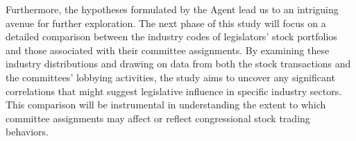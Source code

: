 \documentclass[15pt,letterpaper]{article}
\begin{document}
  Furthermore, the hypotheses formulated by the Agent lead us to an intriguing avenue for further exploration. The next phase of this study will focus on a detailed comparison between the industry codes of legislators' stock portfolios and those associated with their committee assignments. By examining these industry distributions and drawing on data from both the stock transactions and the committees' lobbying activities, the study aims to uncover any significant correlations that might suggest legislative influence in specific industry sectors. This comparison will be instrumental in understanding the extent to which committee assignments may affect or reflect congressional stock trading behaviors.
  
\vspace{5mm} %





\end{document}
